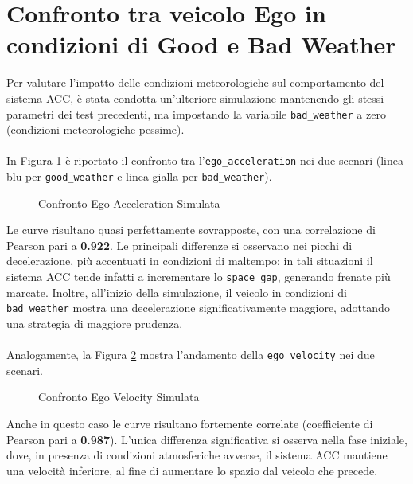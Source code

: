 \section{Confronto tra veicolo Ego in condizioni di Good e Bad Weather}
Per valutare l'impatto delle condizioni meteorologiche sul comportamento del sistema ACC, 
è stata condotta un'ulteriore simulazione mantenendo gli stessi parametri dei test precedenti, 
ma impostando la variabile \texttt{bad\_weather} a zero (condizioni meteorologiche pessime).
\\\\
\noindent In Figura \ref{fig:ego_acceleration_bw} è riportato il confronto tra l'\texttt{ego\_acceleration} 
nei due scenari (linea blu per \texttt{good\_weather} e linea gialla per \texttt{bad\_weather}).
\begin{figure}[H]
    \centering
    \caption{Confronto Ego Acceleration Simulata}
    \label{fig:ego_acceleration_bw}
\end{figure}
\noindent Le curve risultano quasi perfettamente sovrapposte, con una correlazione di Pearson pari a \textbf{0.922}. 
Le principali differenze si osservano nei picchi di decelerazione, più accentuati in condizioni di maltempo: 
in tali situazioni il sistema ACC tende infatti a incrementare lo \texttt{space\_gap}, generando frenate più marcate. 
Inoltre, all'inizio della simulazione, il veicolo in condizioni di \texttt{bad\_weather} mostra una
decelerazione significativamente maggiore, adottando una strategia di maggiore prudenza.
\\\\
\noindent Analogamente, la Figura \ref{fig:ego_velocity_bw} mostra l'andamento della 
\texttt{ego\_velocity} nei due scenari.
\begin{figure}[H]
    \centering
    \caption{Confronto Ego Velocity Simulata}
    \label{fig:ego_velocity_bw}
\end{figure}
\noindent Anche in questo caso le curve risultano fortemente correlate (coefficiente di Pearson pari a \textbf{0.987}). 
L'unica differenza significativa si osserva nella fase iniziale, dove, in presenza di condizioni atmosferiche 
avverse, il sistema ACC mantiene una velocità inferiore, al fine di aumentare lo spazio dal veicolo che precede.
\\\\
